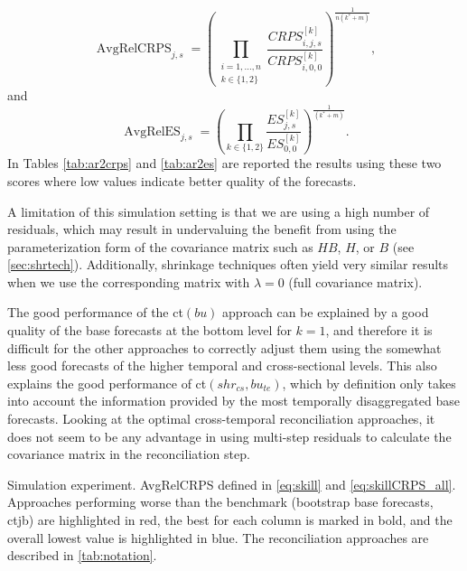 \documentclass[12pt]{article}
\theoremstyle{definition}
\begin{document}
\begin{equation}\label{eq:skillCRPS_all}
	\operatorname{AvgRelCRPS}_{j,s} = \left(\prod_{\substack{i = 1, \dots, n \\ k \in \{1,2\}}}\frac{CRPS^{[k]}_{i, j, s}}{CRPS^{[k]}_{i, 0, 0}}\right)^{\frac{1}{n(k^\ast+m)}},
\end{equation}
and
\begin{equation}\label{eq:skillES_all}
	\operatorname{AvgRelES}_{j,s}= \left(\prod_{k \in \{1,2\}}\frac{ES^{[k]}_{j, s}}{ES^{[k]}_{0, 0}}\right)^{\frac{1}{(k^\ast+m)}}.
\end{equation}
In Tables \ref{tab:ar2crps} and \ref{tab:ar2es} are reported the results using these two scores where low values indicate better quality of the forecasts.

A limitation of this simulation setting is that we are using a high number of residuals, which may result in undervaluing the benefit from using the parameterization form of the covariance matrix such as $HB$, $H$, or $B$ (see \autoref{sec:shrtech}). Additionally, shrinkage techniques often yield very similar results when we use the corresponding matrix with $\lambda = 0$ (full covariance matrix). 

The good performance of the ct$(bu)$ approach can be explained by a good quality of the base forecasts at the bottom level for $k=1$, and therefore it is difficult for the other approaches to correctly adjust them using the somewhat less good forecasts of the higher temporal and cross-sectional levels. This also explains the good performance of ct$(shr_{cs}, bu_{te})$, which by definition only takes into account the information provided by the most temporally disaggregated base forecasts.
Looking at the optimal cross-temporal reconciliation approaches, it does not seem to be any advantage in using multi-step residuals to calculate the covariance matrix in the reconciliation step.

\begin{table}[!t]
	\centering
	\begingroup
	\fontsize{9}{11}\selectfont
	
	\endgroup
	\caption{Simulation experiment. AvgRelCRPS defined in \eqref{eq:skill} and \eqref{eq:skillCRPS_all}. Approaches performing worse than the benchmark (bootstrap base forecasts, ctjb) are highlighted in red, the best for each column is marked in bold, and the overall lowest value is highlighted in blue. The reconciliation approaches are described in \autoref{tab:notation}.}
	\label{tab:ar2crps}
\end{table}
\end{document}
